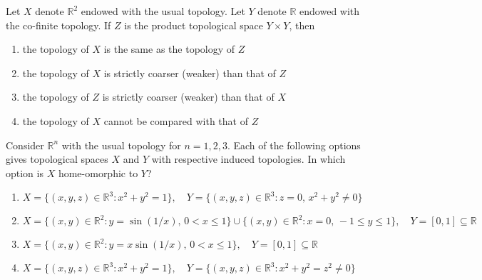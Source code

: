 \item Let \( X \) denote \( \mathbb{R}^2 \) endowed with the usual topology. Let \( Y \) denote \( \mathbb{R} \) endowed with the co-finite topology. If \( Z \) is the product topological space \( Y \times Y \), then

\begin{enumerate}
    \item the topology of \( X \) is the same as the topology of \( Z \)
    \item the topology of \( X \) is strictly coarser (weaker) than that of \( Z \)
    \item the topology of \( Z \) is strictly coarser (weaker) than that of \( X \)
    \item the topology of \( X \) cannot be compared with that of \( Z \)
\end{enumerate}
\vspace{0.5cm}
\item Consider \( \mathbb{R}^n \) with the usual topology for \( n = 1, 2, 3 \). Each of the following options gives topological spaces \( X \) and \( Y \) with respective induced topologies. In which option is \( X \) home-omorphic to \( Y \)?

\begin{enumerate}
    \item \( X = \{(x, y, z) \in \mathbb{R}^3 : x^2 + y^2 = 1\}, \quad Y = \{(x, y, z) \in \mathbb{R}^3 : z = 0, \, x^2 + y^2 \neq 0\} \)
    \item \( X = \{(x, y) \in \mathbb{R}^2 : y = \sin(1/x), \, 0 < x \leq 1\} \cup \{(x, y) \in \mathbb{R}^2 : x = 0, \, -1 \leq y \leq 1\}, \quad Y = [0, 1] \subseteq\mathbb{R} \)
    \item \( X = \{(x, y) \in \mathbb{R}^2 : y = x \sin(1/x), \, 0 < x \leq 1\}, \quad Y = [0, 1] \subseteq \mathbb{R} \)
    \item \( X = \{(x, y, z) \in \mathbb{R}^3 : x^2 + y^2 = 1\}, \quad Y = \{(x, y, z) \in \mathbb{R}^3 : x^2 + y^2 = z^2 \neq 0\} \)
\end{enumerate}

\vspace{0.5cm}

